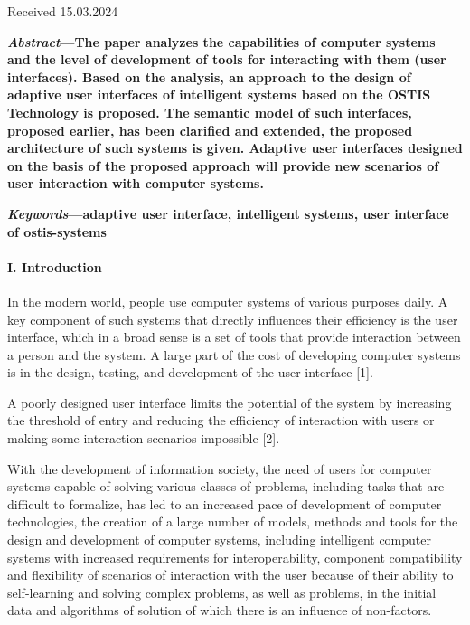 \documentclass[10pt]{article}
\begin{document}
\begin{flushright}
    \large Received 15.03.2024
\end{flushright}

\newpage

\linespread{0.9}

\maketitle

\normalsize

\textbf{\textit{Abstract}—The paper analyzes the capabilities of com\-puter
systems and the level of development of tools for
interacting with them (user interfaces). Based on the analysis,
an approach to the design of adaptive user interfaces
of intelligent systems based on the OSTIS Technology is
proposed. The semantic model of such interfaces, proposed
earlier, has been clarified and exten\-ded, the propo\-sed architecture
of such systems is given. Adaptive user interfaces
designed on the basis of the propo\-sed approach will provide
new scenarios of user interaction with computer systems.}

\textbf{\textit{Keywords}—adaptive user interface, intelligent systems,
user interface of ostis-systems}

\begin{center}
    \paragraph{I. Introduction}
\end{center}

\vspace{5mm}In the modern world, people use computer systems
of various purposes daily. A key component of such
systems that directly influences their efficiency is the user
interface, which in a broad sense is a set of tools that
provide interaction between a person and the system.
A large part of the cost of developing computer
systems is in the design, testing, and development of the
user interface [1].

A poorly designed user interface limits the potential
of the system by increasing the threshold of entry and reducing
the efficiency of interaction with users or making
some interaction scenarios impossible [2].

With the development of information society, the need
of users for computer systems capable of solving various
classes of problems, including tasks that are difficult to
formalize, has led to an increased pace of development
of computer technologies, the creation of a large number
of models, methods and tools for the design and development
of computer systems, including intelligent computer
systems with increased requirements for inter\-operability,
component compatibility and flexibility of scenarios of
interaction with the user because of their ability to
self-learning and solving complex problems, as well as
problems, in the initial data and algorithms of solution
of which there is an influence of non-factors.
\end{document}
